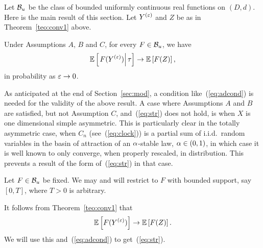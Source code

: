 Let ${\cal B}_u$ be the class of bounded uniformly continuous real functions on $(D,d)$. Here is the main result of this section.
Let $Y^{(\varepsilon)}$ and $Z$ be as in Theorem~\ref{teo:conv1} above.

\begin{theo}
\label{teo:str}
Under Assumptions $A$, $B$ and $C$, for every $F\in{\cal B}_u$, we have
\begin{equation}
\label{eq:str}
\esp\left[\left.F(Y^{(\eps)})\right|\tau\right]\to\esp\left[F(Z)\right],
\end{equation}
in probability as $\varepsilon\to0$.
\end{theo}



\begin{rmk}
\label{rmk:nec_cond}
As anticipated at the end of Section~\ref{sec:mod}, a condition like~(\ref{eq:adcond}) is needed for the validity of the above result. A case
where Assumptions $A$ and $B$ are satisfied, but not Assumption $C$, and~(\ref{eq:str}) does not hold, is when $X$ is one dimensional simple
asymmetric. This is particularly clear in the totally asymmetric case, when $C_n$ (see~(\ref{eq:clock})) is a partial sum of i.i.d.~random variables
in the basin of attraction of an $\alpha$-stable law, $\alpha\in(0,1)$, in which case it is well known to only converge, when properly rescaled, in
distribution. This prevents a result of the form of~(\ref{eq:str}) in that case.
\end{rmk}




Let $F\in{\cal B}_u$ be fixed. We may and will restrict to $F$ with bounded support, say $[0,T]$, where $T>0$ is arbitrary.

It follows from Theorem~\ref{teo:conv1} that 
\begin{equation}
\label{eq:s1}
\esp\left[F(Y^{(\eps)})\right]\to\esp\left[F(Z)\right].
\end{equation}
We will use this and~(\ref{eq:adcond}) to get~(\ref{eq:str}).

